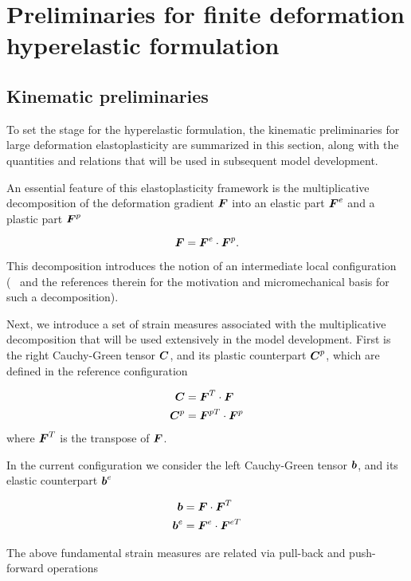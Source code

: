 \section{Preliminaries for finite deformation hyperelastic formulation}\label{sec:preliminaries}

\subsection{Kinematic preliminaries}
To set the stage for the hyperelastic formulation, the kinematic
preliminaries for large deformation elastoplasticity are summarized 
in this section, along with the quantities and relations that will be
used in subsequent model development.

An essential feature of this elastoplasticity framework is the
multiplicative decomposition of the deformation gradient ${\boldsymbol{F}}$ into 
an elastic part ${\boldsymbol{F}}^e$ and a plastic part ${\boldsymbol{F}}^p$

\begin{equation}
  {\boldsymbol{F}} = {\boldsymbol{F}}^e \cdot {\boldsymbol{F}}^p.
\end{equation}

This decomposition introduces the notion of an intermediate local
configuration (\cf\ \cite{SimoHughes:98} and the references therein
for the motivation and micromechanical basis for such a
decomposition).

Next, we introduce a set of strain measures associated with the
multiplicative decomposition that will be used extensively in the
model development. First is the right Cauchy-Green tensor ${\boldsymbol{C}}$, and
its plastic counterpart ${\boldsymbol{C}}^p$, which are defined in the reference
configuration

\begin{align}
  {\boldsymbol{C}} &= {\boldsymbol{F}}^T \cdot {\boldsymbol{F}}\\ {\boldsymbol{C}}^p &= {\boldsymbol{F}}^{pT} \cdot {\boldsymbol{F}}^p
\end{align}
where ${\boldsymbol{F}}^T$ is the transpose of ${\boldsymbol{F}}$.

In the current configuration we consider the left Cauchy-Green tensor
${\boldsymbol{b}}$, and its elastic counterpart ${{\boldsymbol{b}}}^e$

\begin{align}
  {\boldsymbol{b}} &= {\boldsymbol{F}} \cdot {\boldsymbol{F}}^{T}\\ {\boldsymbol{b}}^e &= {\boldsymbol{F}}^e \cdot
  {\boldsymbol{F}}^{eT}\label{eq:be}
\end{align}

The above fundamental strain measures are related via pull-back and
push-forward operations

